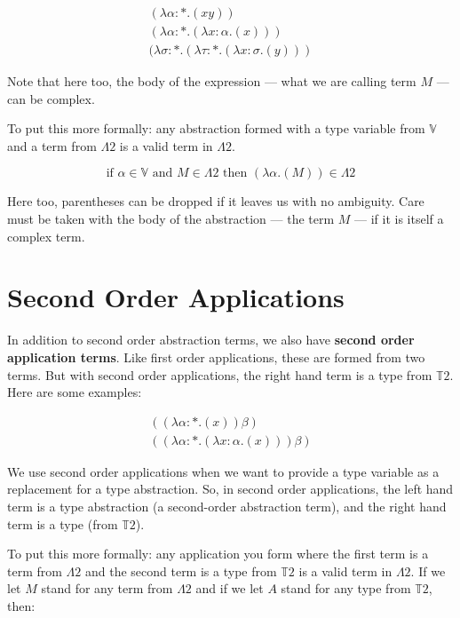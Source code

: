\documentclass{book}
\numberwithin{equation}{chapter}
\newcommand{\vocab}{\textbf}
\begin{document}
\begin{align}
  (\lambda \alpha : *.(x y)) \\
  (\lambda \alpha : *.(\lambda x : \alpha.(x))) \\
  (\lambda \sigma : *.(\lambda \tau : *.(\lambda x : \sigma.(y)))
\end{align}

\noindent
Note that here too, the body of the expression --- what we are calling term $M$ --- can be complex.

To put this more formally: any abstraction formed with a type variable from $\mathbb{V}$ and a term from $\Lambda 2$ is a valid term in $\Lambda 2$.

\begin{equation}
\text{if } \alpha \in \mathbb{V} \text{ and } M \in \Lambda 2 \text{ then } (\lambda \alpha.(M)) \in \Lambda 2
\end{equation}

\noindent
Here too, parentheses can be dropped if it leaves us with no ambiguity. Care must be taken with the body of the abstraction --- the term $M$ --- if it is itself a complex term.


\section{Second Order Applications}

In addition to second order abstraction terms, we also have \vocab{second order application terms}. Like first order applications, these are formed from two terms. But with second order applications, the right hand term is a type from $\mathbb{T}2$. Here are some examples:

\begin{align}
  ((\lambda \alpha : *.(x)) \beta) \\
  ((\lambda \alpha : *.(\lambda x : \alpha.(x))) \beta)
\end{align}

\noindent
We use second order applications when we want to provide a type variable as a replacement for a type abstraction. So, in second order applications, the left hand term is a type abstraction (a second-order abstraction term), and the right hand term is a type (from $\mathbb{T}2$).

To put this more formally: any application you form where the first term is a term from $\Lambda 2$ and the second term is a type from $\mathbb{T}2$ is a valid term in $\Lambda 2$. If we let $M$ stand for any term from $\Lambda 2$ and if we let $A$ stand for any type from $\mathbb{T}2$, then:
\end{document}
